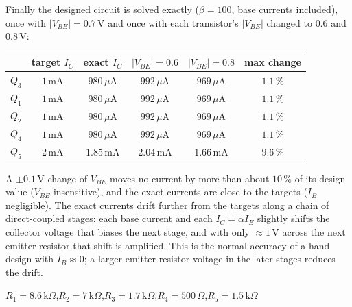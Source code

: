 \documentclass[11pt]{article}
\begin{document}
Finally the designed circuit is solved exactly ($\beta=100$, base currents included), once with $|V_{BE}|=0.7$\,V and once with each transistor's $|V_{BE}|$ changed to $0.6$ and $0.8$\,V:\begin{center}\renewcommand{\arraystretch}{1.35}
\begin{tabular}{cccccc}
\toprule
 & target $I_C$ & exact $I_C$ & $|V_{BE}|=0.6$ & $|V_{BE}|=0.8$ & max change \\
\midrule
$Q_{3}$ & $1\,\mathrm{m}\mathrm{A}$ & $980\,\mu \mathrm{A}$ & $992\,\mu \mathrm{A}$ & $969\,\mu \mathrm{A}$ & $1.1\,\%$ \\
$Q_{1}$ & $1\,\mathrm{m}\mathrm{A}$ & $980\,\mu \mathrm{A}$ & $992\,\mu \mathrm{A}$ & $969\,\mu \mathrm{A}$ & $1.1\,\%$ \\
$Q_{2}$ & $1\,\mathrm{m}\mathrm{A}$ & $980\,\mu \mathrm{A}$ & $992\,\mu \mathrm{A}$ & $969\,\mu \mathrm{A}$ & $1.1\,\%$ \\
$Q_{4}$ & $1\,\mathrm{m}\mathrm{A}$ & $980\,\mu \mathrm{A}$ & $992\,\mu \mathrm{A}$ & $969\,\mu \mathrm{A}$ & $1.1\,\%$ \\
$Q_{5}$ & $2\,\mathrm{m}\mathrm{A}$ & $1.85\,\mathrm{m}\mathrm{A}$ & $2.04\,\mathrm{m}\mathrm{A}$ & $1.66\,\mathrm{m}\mathrm{A}$ & $9.6\,\%$ \\
\bottomrule
\end{tabular}\end{center}
A $\pm0.1$\,V change of $V_{BE}$ moves no current by more than about $10\,\%$ of its design value ($V_{BE}$-insensitive), and the exact currents are close to the targets ($I_B$ negligible). The exact currents drift further from the targets along a chain of direct-coupled stages: each base current and each $I_C = \alpha I_E$ slightly shifts the collector voltage that biases the next stage, and with only $\approx1$\,V across the next emitter resistor that shift is amplified. This is the normal accuracy of a hand design with $I_B\approx0$; a larger emitter-resistor voltage in the later stages reduces the drift.
\begin{ansbox}
$R_{1} = 8.6\,\mathrm{k}\Omega$,\quad $R_{2} = 7\,\mathrm{k}\Omega$,\quad $R_{3} = 1.7\,\mathrm{k}\Omega$,\quad $R_{4} = 500\,\Omega$,\quad $R_{5} = 1.5\,\mathrm{k}\Omega$
\end{ansbox}
\end{document}
